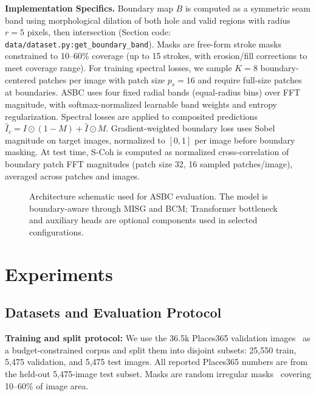 \documentclass[10pt,conference]{IEEEtran}
\begin{document}
\textbf{Implementation Specifics.}
Boundary map $B$ is computed as a symmetric seam band using morphological
dilation of both hole and valid regions with radius $r{=}5$ pixels, then
intersection (Section code: \texttt{data/dataset.py:get\_boundary\_band}).
Masks are free-form stroke masks constrained to 10--60\% coverage
(up to 15 strokes, with erosion/fill corrections to meet coverage range).
For training spectral losses, we sample $K{=}8$ boundary-centered patches per
image with patch size $p_s{=}16$ and require full-size patches at boundaries.
ASBC uses four fixed radial bands (equal-radius bins) over FFT magnitude,
with softmax-normalized learnable band weights and entropy regularization.
Spectral losses are applied to composited predictions
$\hat{I}_c = I\odot(1-M) + \hat{I}\odot M$.
Gradient-weighted boundary loss uses Sobel magnitude on target images,
normalized to $[0,1]$ per image before boundary masking.
At test time, S-Coh is computed as normalized cross-correlation of boundary
patch FFT magnitudes (patch size 32, 16 sampled patches/image), averaged
across patches and images.

\begin{figure}[t]
  \centering
  \caption{Architecture schematic used for ASBC evaluation. The model is
    boundary-aware through MISG and BCM; Transformer bottleneck and auxiliary
    heads are optional components used in selected configurations.}
  \label{fig:arch}
\end{figure}

\section{Experiments}
\label{sec:experiments}

\subsection{Datasets and Evaluation Protocol}
\textbf{Training and split protocol:}
We use the 36.5k Places365 validation images~\cite{zhou2017places} as a
budget-constrained corpus and split them into disjoint subsets:
25,550 train, 5,475 validation, and 5,475 test images. All reported
Places365 numbers are from the held-out 5,475-image test subset. Masks are
random irregular masks~\cite{liu2018partial} covering 10–60\% of image area.
\end{document}
